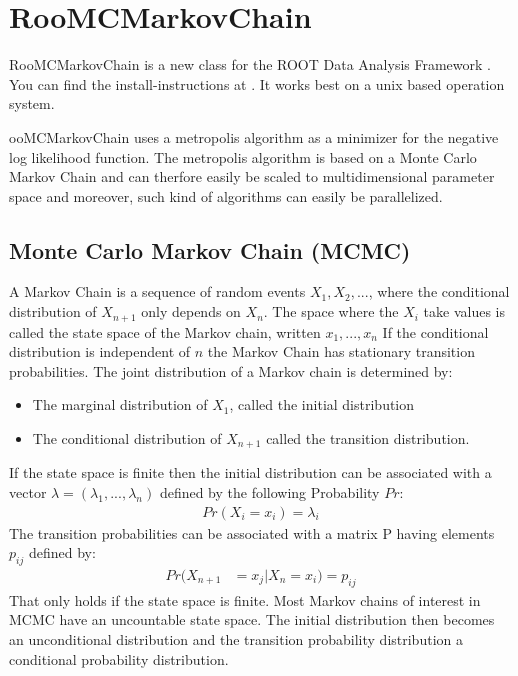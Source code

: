 \documentclass[english]{uzhpub}
\begin{document}
\section{RooMCMarkovChain} \label{sec:RooMCMC}
RooMCMarkovChain is a new class for the ROOT Data Analysis Framework \cite{bib:root}. You can find the install-instructions at \cite{bib:root}. It works best on a unix based operation system.

 ooMCMarkovChain uses a metropolis algorithm as a minimizer for the negative log likelihood function. The metropolis algorithm is based on a Monte Carlo Markov Chain and can therfore easily be scaled to multidimensional parameter space and moreover, such kind of algorithms can easily be parallelized.

\subsection{Monte Carlo Markov Chain (MCMC)}  \label{sec:MCMC}
A Markov Chain is a sequence of random events $X_1,X_2,...$, where the conditional distribution of $X_{n+1}$ only depends on $X_n$. The space where the $X_i$ take values is called the state space of the Markov chain, written ${x_1,...,x_n}$ If the conditional distribution is independent of $n$ the Markov Chain has stationary transition probabilities.
The joint distribution of a Markov chain is determined by:
\begin{itemize}
 \item The marginal distribution of $X_1$, called the initial distribution
 \item The conditional distribution of $X_{n+1}$ called the transition distribution.
\end{itemize}
If the state space is finite then the initial distribution can be associated with a vector $\lambda = (\lambda_1,...,\lambda_n)$ defined by the following Probability $Pr$:
\begin{align}
 Pr(X_i = x_i) = \lambda_i
\end{align}
The transition probabilities can be associated with a matrix P having elements $p_{ij}$ defined by:
\begin{align}
 Pr(X_{n+1} & = x_j | X_n = x_i) = p_{ij}
\end{align}
That only holds if the state space is finite. Most Markov chains of interest in MCMC have an uncountable state space. The initial distribution then becomes an unconditional distribution and the transition probability distribution a conditional probability distribution.
\end{document}
